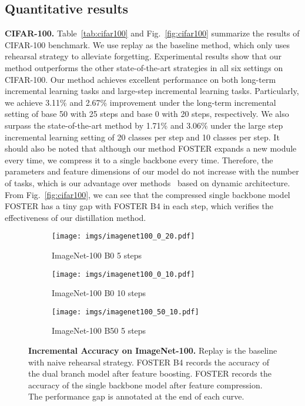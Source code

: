 \documentclass[runningheads]{llncs}
\begin{document}
\subsection{Quantitative results}
\noindent\textbf{CIFAR-100.}
Table~\ref{tab:cifar100} and Fig.~\ref{fig:cifar100} summarize the results of CIFAR-100 benchmark. We use replay as the baseline method, which only uses rehearsal strategy to alleviate forgetting. Experimental results show that our method outperforms the other state-of-the-art strategies in all six settings on CIFAR-100. Our method achieves excellent performance on both long-term incremental learning tasks and large-step incremental learning tasks. Particularly, we achieve 3.11\% and 2.67\% improvement under the long-term incremental setting of base 50 with 25 steps and base 0 with 20 steps, respectively. We also surpass the state-of-the-art method by 1.71\% and 3.06\% under the large step incremental learning setting of 20 classes per step and 10 classes per step.  It should also be noted that although our method FOSTER expands a new module every time, we compress it to a single backbone every time. Therefore, the parameters and feature dimensions of our model do not increase with the number of tasks, which is our advantage over methods~\cite{der,simpleder,dytox} based on dynamic architecture. From Fig.~\ref{fig:cifar100}, we can see that the compressed single backbone model FOSTER has a tiny gap with FOSTER B4 in each step, which verifies the effectiveness of our distillation method.

\begin{figure*}[t]
  \centering
  \begin{subfigure}[b]{0.32\linewidth}
    \texttt{[image: imgs/imagenet100\_0\_20.pdf]}
    \caption{\scriptsize ImageNet-100  B0   5  steps}
    \label{fig:imagenet_inc1}
  \end{subfigure}
  \hfill
  \begin{subfigure}[b]{0.32\linewidth}
    \texttt{[image: imgs/imagenet100\_0\_10.pdf]}
    \caption{\scriptsize ImageNet-100  B0   10  steps}
    \label{fig:imagenet_inc2}
  \end{subfigure}
   \hfill
  \begin{subfigure}[b]{0.32\linewidth}
    \texttt{[image: imgs/imagenet100\_50\_10.pdf]}
    \caption{\scriptsize ImageNet-100  B50  5  steps}
    \label{fig:imagenet_inc3}
  \end{subfigure}
  \caption{\small  \textbf{Incremental Accuracy on ImageNet-100.} Replay is the baseline with naive rehearsal strategy. FOSTER B4 records the accuracy of the dual branch model after feature boosting. FOSTER records the accuracy of the single backbone model after feature compression. The performance gap is annotated at the end of each curve.}
  \label{fig:ImageNet}
\end{figure*}
\end{document}
